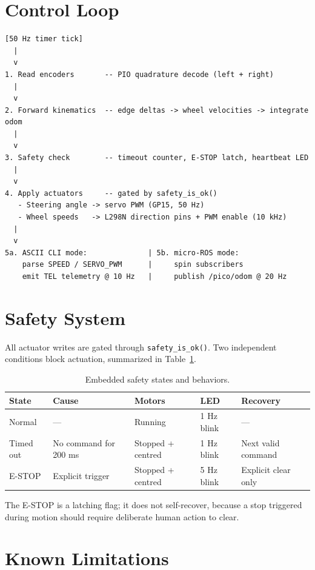 \documentclass[12pt,a4paper]{report}
\begin{document}
\section{Control Loop}

\begin{lstlisting}
[50 Hz timer tick]
  |
  v
1. Read encoders       -- PIO quadrature decode (left + right)
  |
  v
2. Forward kinematics  -- edge deltas -> wheel velocities -> integrate odom
  |
  v
3. Safety check        -- timeout counter, E-STOP latch, heartbeat LED
  |
  v
4. Apply actuators     -- gated by safety_is_ok()
   - Steering angle -> servo PWM (GP15, 50 Hz)
   - Wheel speeds   -> L298N direction pins + PWM enable (10 kHz)
  |
  v
5a. ASCII CLI mode:              | 5b. micro-ROS mode:
    parse SPEED / SERVO_PWM      |     spin subscribers
    emit TEL telemetry @ 10 Hz   |     publish /pico/odom @ 20 Hz
\end{lstlisting}

\section{Safety System}

All actuator writes are gated through \texttt{safety\_is\_ok()}. Two independent
conditions block actuation, summarized in Table~\ref{tab:pico_safety}.

\begin{table}[H]
\centering
\caption{Embedded safety states and behaviors.}
\label{tab:pico_safety}
\begin{tabularx}{\textwidth}{|p{2.2cm}|p{2.5cm}|p{1.8cm}|p{2.4cm}|X|}
\hline
\textbf{State} & \textbf{Cause} & \textbf{Motors} & \textbf{LED} & \textbf{Recovery} \\
\hline
Normal & --- & Running & 1 Hz blink & --- \\
\hline
Timed out & No command for 200 ms & Stopped + centred & 1 Hz blink & Next valid command \\
\hline
E-STOP & Explicit trigger & Stopped + centred & 5 Hz blink & Explicit clear only \\
\hline
\end{tabularx}
\end{table}

The E-STOP is a latching flag; it does not self-recover, because a stop triggered
during motion should require deliberate human action to clear.

\section{Known Limitations}
\end{document}
